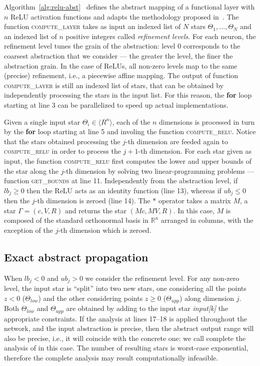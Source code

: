 Algorithm~\ref{alg:relu-abst}~\cite{guidotti2021pynever} defines 
the abstract mapping of a functional layer with $n$ ReLU activation 
functions and adapts the methodology proposed in~\cite{tran2019star}. 
The function \textsc{compute\_layer} takes as input an indexed list 
of $N$ stars $\Theta_1, \ldots, \Theta_N$ and an indexed list of $n$ 
positive integers called \emph{refinement levels}. For each neuron, 
the refinement level tunes the grain of the abstraction: level $0$
corresponds to the coarsest abstraction that we consider --- the
greater the level, the finer the abstraction grain. In the case of
ReLUs, all non-zero levels map to the same (precise) refinement, i.e.,
a piecewise affine mapping. The output of function
\textsc{compute\_layer} is still an indexed list of stars, that can be
obtained by independently processing the stars in the input list.
For this reason, the \textbf{for} loop starting at line 3
can be  parallelized to speed up actual implementations. 

Given a single input star $\Theta_i \in \langle R^n \rangle$, each 
of the $n$ dimensions is processed in turn by the \textbf{for} loop 
starting at line 5 and involing the function \textsc{compute\_relu}. 
Notice that the stars obtained processing the $j$-th dimension are 
feeded again to \textsc{compute\_relu} in order to process the 
$j+1$-th dimension. For each star given as input, the
function \textsc{compute\_relu} first computes the lower and upper
bounds of the star along the $j$-th dimension by solving two
linear-programming problems --- function \textsc{get\_bounds} at line
11. Independently from the abstraction level, if $lb_j \geq 0$ then
the ReLU acts as an identity function (line 13), whereas if $ub_j \leq
0$ then the $j$-th dimension is zeroed (line 14). The $\ast$ operator
takes a matrix $M$, a star $\Gamma = (c, V, R)$ and returns the star
$(Mc, MV, R)$. In this case, $M$ is composed of the standard orthonormal
basis in $\mathbb{R}^n$ arranged in columns, with the exception of 
the $j$-th dimension which is zeroed. 

\subsection{Exact abstract propagation}

When $lb_j < 0$ and $ub_j > 0$ we consider the refinement level. 
For any non-zero level, the input star is ``split” into two new stars, 
one considering all the points $z < 0$ ($\Theta_{low}$) and the other 
considering points $z \geq 0$ ($\Theta_{upp}$) along dimension $j$. 
Both $\Theta_{low}$ and $\Theta_{upp}$ are obtained by adding to the 
input star \textit{input[k]} the appropriate constraints. 
If the analysis at lines 17–18 is applied throughout the network, 
and the input abstraction is precise, then the abstract output 
range will also be precise, i.e., it will coincide with the concrete one: 
we call complete the analysis of \nevertwo{} in this case. The number
of resulting stars is worst-case exponential, therefore the complete
analysis may result computationally infeasible.

